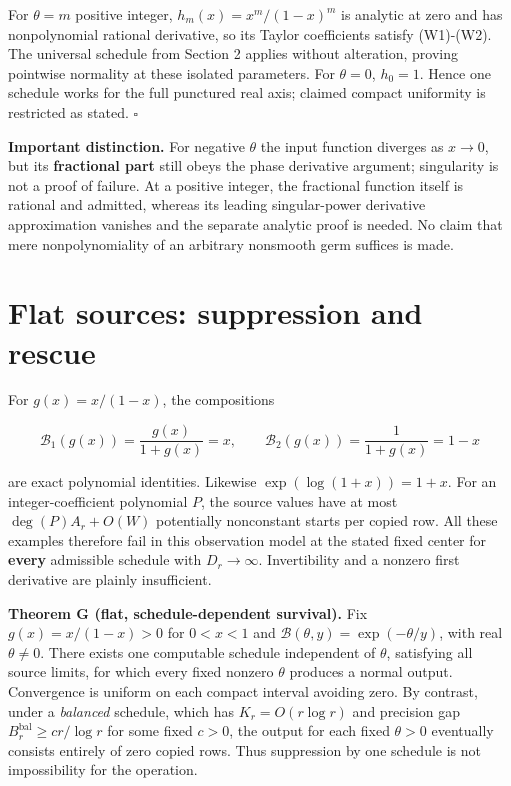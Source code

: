 \documentclass[11pt,a4paper]{article}
\begin{document}
For \(\theta=m\) positive integer, \(h_m(x)=x^m/(1-x)^m\) is analytic at
zero and has nonpolynomial rational derivative, so its Taylor
coefficients satisfy (W1)-(W2). The universal schedule from Section 2
applies without alteration, proving pointwise normality at these
isolated parameters. For \(\theta=0\), \(h_0=1\). Hence one schedule
works for the full punctured real axis; claimed compact uniformity is
restricted as stated. \(\square\)

\textbf{Important distinction.} For negative \(\theta\) the input
function diverges as \(x\to 0\), but its \textbf{fractional part} still
obeys the phase derivative argument; singularity is not a proof of
failure. At a positive integer, the fractional function itself is
rational and admitted, whereas its leading singular-power derivative
approximation vanishes and the separate analytic proof is needed. No
claim that mere nonpolynomiality of an arbitrary nonsmooth germ suffices
is made.

\section{Flat sources: suppression and
rescue}\label{flat-sources-suppression-and-rescue}

For \(g(x)=x/(1-x)\), the compositions

\[
\mathcal B_1(g(x))=\frac{g(x)}{1+g(x)}=x,\qquad \mathcal B_2(g(x))=\frac1{1+g(x)}=1-x
\]

are exact polynomial identities. Likewise \(\exp(\log(1+x))=1+x\). For
an integer-coefficient polynomial \(P\), the source values have at most
\(\deg(P)A_r+O(W)\) potentially nonconstant starts per copied row. All
these examples therefore fail in this observation model at the stated
fixed center for \textbf{every} admissible schedule with
\(D_r\to \infty\). Invertibility and a nonzero first derivative are
plainly insufficient.

\textbf{Theorem G (flat, schedule-dependent survival).} Fix
\(g(x)=x/(1-x)>0\) for \(0< x< 1\) and
\(\mathcal B(\theta,y)=\exp(-\theta/y)\), with real \(\theta\ne 0\).
There exists one computable schedule independent of \(\theta\),
satisfying all source limits, for which every fixed nonzero \(\theta\)
produces a normal output. Convergence is uniform on each compact
interval avoiding zero. By contrast, under a \emph{balanced} schedule,
which has \(K_r=O(r \log r)\) and precision gap
\(B_r^{\mathrm{bal}}\ge c r/\log r\) for some fixed \(c>0\), the output
for each fixed \(\theta>0\) eventually consists entirely of zero copied
rows. Thus suppression by one schedule is not impossibility for the
operation.
\end{document}

